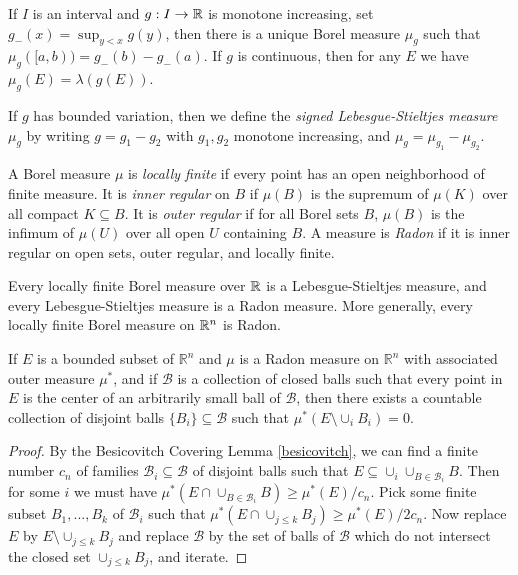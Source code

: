 \documentclass[letterpaper,11pt]{report}
\begin{document}
\begin{thm}\label{lebesgue-stieltjes} If $I$ is an interval and $g: I \rightarrow \mathbb{R}$ is monotone increasing, set $g_-(x) = \sup_{y < x} g(y)$, then there is a unique Borel measure $\mu_g$ such that $\mu_g([a,b)) = g_-(b) - g_-(a)$. If $g$ is continuous, then for any $E$ we have $\mu_g(E) = \lambda(g(E))$.
\end{thm}

\begin{defn} If $g$ has bounded variation, then we define the \emph{signed Lebesgue-Stieltjes measure} $\mu_g$ by writing $g = g_1 - g_2$ with $g_1, g_2$ monotone increasing, and $\mu_g = \mu_{g_1} - \mu_{g_2}$.
\end{defn}

\begin{defn} A Borel measure $\mu$ is \emph{locally finite} if every point has an open neighborhood of finite measure. It is \emph{inner regular} on $B$ if $\mu(B)$ is the supremum of $\mu(K)$ over all compact $K \subseteq B$. It is \emph{outer regular} if for all Borel sets $B$, $\mu(B)$ is the infimum of $\mu(U)$ over all open $U$ containing $B$. A measure is \emph{Radon} if it is inner regular on open sets, outer regular, and locally finite.
\end{defn}

\begin{prop} Every locally finite Borel measure over $\mathbb{R}$ is a Lebesgue-Stieltjes measure, and every Lebesgue-Stieltjes measure is a Radon measure. More generally, every locally finite Borel measure on $\mathbb{R}^n$ is Radon.
\end{prop}

\begin{thm}\label{besicovitch-radon} If $E$ is a bounded subset of $\mathbb{R}^n$ and $\mu$ is a Radon measure on $\mathbb{R}^n$ with associated outer measure $\mu^*$, and if $\mathcal{B}$ is a collection of closed balls such that every point in $E$ is the center of an arbitrarily small ball of $\mathcal{B}$, then there exists a countable collection of disjoint balls $\{B_i\} \subseteq \mathcal{B}$ such that $\mu^*(E\setminus \cup_i B_i) = 0$.
\end{thm}
\begin{proof} By the Besicovitch Covering Lemma \ref{besicovitch}, we can find a finite number $c_n$ of families $\mathcal{B}_i \subseteq \mathcal{B}$ of disjoint balls such that $E \subseteq \cup_i \cup_{B \in \mathcal{B}_i} B$. Then for some $i$ we must have $\mu^*(E\cap \cup_{B\in \mathcal{B}_i}B) \ge \mu^*(E)/c_n$. Pick some finite subset $B_1, ..., B_k$ of $\mathcal{B}_i$ such that $\mu^*(E\cap \cup_{j\le k} B_j) \ge \mu^*(E)/2c_n$. Now replace $E$ by $E\setminus \cup_{j \le k} B_j$ and replace $\mathcal{B}$ by the set of balls of $\mathcal{B}$ which do not intersect the closed set $\cup_{j \le k} B_j$, and iterate.
\end{proof}
\end{document}
